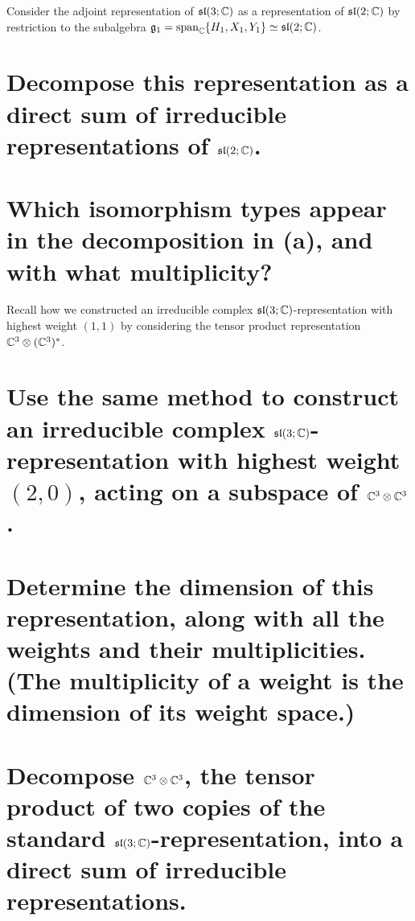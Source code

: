 \documentclass[
	pages,
	boxes,
	color=WildStrawberry
]{homework}
\begin{document}
\begin{problem}
Consider the adjoint representation of $\mathfrak{sl}(3; \mathbb{C})$ as a representation of $\mathfrak{sl}(2;\mathbb{C})$ by restriction to the subalgebra $\mathfrak{g}_1 = \operatorname{span}_{\mathbb{C}}\{H_1, X_1, Y_1\} \simeq \mathfrak{sl}(2; \mathbb{C})$.
\begin{parts}
	\part{Decompose this representation as a direct sum of irreducible representations of $\mathfrak{sl}(2; \mathbb{C})$.}\label{part:1a}
	\part{Which isomorphism types appear in the decomposition in (a), and with what multiplicity?}\label{part:1b}
\end{parts}
\end{problem}

\begin{problem}
Recall how we constructed an irreducible complex $\mathfrak{sl}(3;\mathbb{C})$-representation with highest weight $(1, 1)$ by considering the tensor product representation $\mathbb{C}^3 \otimes (\mathbb{C}^3)^{\ast}$.
\begin{parts}
	\part{Use the same method to construct an irreducible complex $\mathfrak{sl}(3;\mathbb{C})$-representation with highest weight $(2, 0)$, acting on a subspace of $\mathbb{C}^3 \otimes \mathbb{C}^3$.}\label{part:2a}
	\part{Determine the dimension of this representation, along with all the weights and their multiplicities. (The multiplicity of a weight is the dimension of its weight space.)}\label{part:2b}
	\part{Decompose $\mathbb{C}^3 \otimes \mathbb{C}^3$, the tensor product of two copies of the standard $\mathfrak{sl}(3; \mathbb{C})$-representation, into a direct sum of irreducible representations.}\label{part:2c}
\end{parts}
\end{problem}
\end{document}
